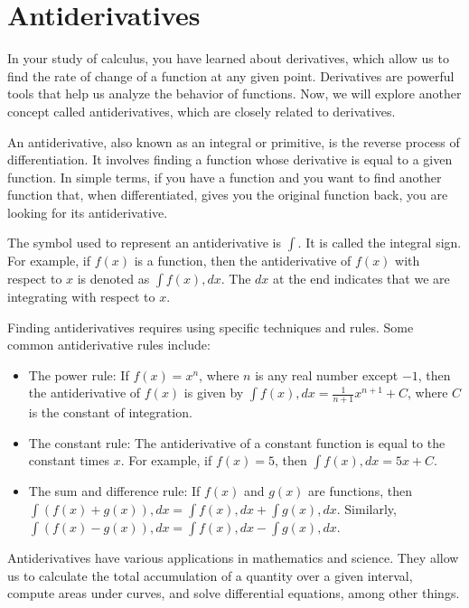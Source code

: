 \chapter{Antiderivatives}

In your study of calculus, you have learned about derivatives, which
allow us to find the rate of change of a function at any given
point. Derivatives are powerful tools that help us analyze the
behavior of functions. Now, we will explore another concept called
antiderivatives, which are closely related to derivatives.

An antiderivative, also known as an integral or primitive, is the
reverse process of differentiation. It involves finding a function
whose derivative is equal to a given function. In simple terms, if you
have a function and you want to find another function that, when
differentiated, gives you the original function back, you are looking
for its antiderivative.

The symbol used to represent an antiderivative is $\int$. It is called
the integral sign. For example, if $f(x)$ is a function, then the
antiderivative of $f(x)$ with respect to $x$ is denoted as $\int f(x)
, dx$. The $dx$ at the end indicates that we are integrating with
respect to $x$.

Finding antiderivatives requires using specific techniques and
rules. Some common antiderivative rules include:

\begin{itemize}
\item The power rule: If $f(x) = x^n$, where $n$ is any real number
  except $-1$, then the antiderivative of $f(x)$ is given by $\int
  f(x) , dx = \frac{1}{n+1}x^{n+1} + C$, where $C$ is the constant of
  integration.

\item The constant rule: The antiderivative of a constant function is
  equal to the constant times $x$. For example, if $f(x) = 5$, then
  $\int f(x) , dx = 5x + C$.

\item The sum and difference rule: If $f(x)$ and $g(x)$ are functions,
  then $\int (f(x) + g(x)) , dx = \int f(x) , dx + \int g(x) ,
  dx$. Similarly, $\int (f(x) - g(x)) , dx = \int f(x) , dx - \int
  g(x) , dx$.
\end{itemize}

Antiderivatives have various applications in mathematics and
science. They allow us to calculate the total accumulation of a
quantity over a given interval, compute areas under curves, and solve
differential equations, among other things.

